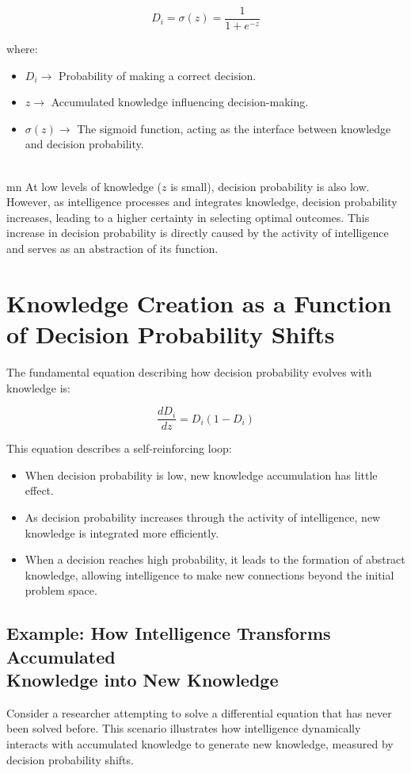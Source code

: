 \documentclass{article}
\newcommand{\no}{\noindent}
\newcommand{\mn}{\medskip\noindent}
\begin{document}
$$
D_i = \sigma(z) = \frac{1}{1+e^{-z}}
$$

\no
where:
\begin{itemize}
\item  $D_i \to$  Probability of making a correct decision.
\item $z\to$  Accumulated knowledge influencing decision-making.
\item  $\sigma(z)\to$ The sigmoid function, acting as the interface between knowledge and decision probability.
\end{itemize}

\\mn
At low levels of knowledge ($z$ is small), decision probability is also low. However, as intelligence processes and integrates knowledge, decision probability increases, leading to a higher certainty in selecting optimal outcomes. This increase in decision probability is directly caused by the activity of intelligence and serves as an abstraction of its function.

\section{Knowledge Creation as a Function of Decision Probability Shifts}
The fundamental equation describing how decision probability evolves with knowledge is:

$$
\frac{dD_i}{dz} = D_i(1 - D_i)
$$

\no
This equation describes a self-reinforcing loop:
\begin{itemize}
\item   When decision probability is low, new knowledge accumulation has little effect.
\item As decision probability increases through the activity of intelligence, new knowledge is integrated more efficiently.
\item  When a decision reaches high probability, it leads to the formation of abstract knowledge, allowing intelligence to make new connections beyond the initial problem space.
\end{itemize}


\subsection*{Example: How Intelligence Transforms Accumulated\\ Knowledge into New Knowledge}
Consider a researcher attempting to solve a differential equation that has never been solved before. This scenario illustrates how intelligence dynamically interacts with accumulated knowledge to generate new knowledge, measured by decision probability shifts.
\end{document}
